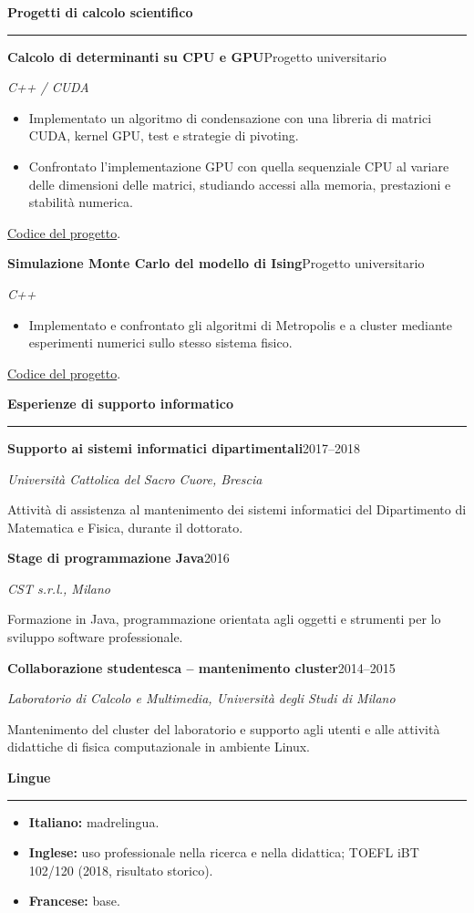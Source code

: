\documentclass[10pt,a4paper]{article}
\newcommand{\cvsection}[1]{%
    \Needspace{4\baselineskip}%
    \vspace{0.8em}%
    {\large\bfseries\color{accent} #1}\par
    \vspace{0.2em}\hrule\vspace{0.45em}%
}
\newcommand{\entry}[4]{%
    \Needspace{4\baselineskip}%
    \textbf{#1}\hfill #2\par
    \textit{#3}\par
    #4\par\vspace{0.45em}%
}
\begin{document}
\cvsection{Progetti di calcolo scientifico}
\entry{Calcolo di determinanti su CPU e GPU}{Progetto universitario}{C++ / CUDA}{%
\begin{itemize}
    \item Implementato un algoritmo di condensazione con una libreria di matrici CUDA, kernel GPU, test e strategie di pivoting.
    \item Confrontato l'implementazione GPU con quella sequenziale CPU al variare delle dimensioni delle matrici, studiando accessi alla memoria, prestazioni e stabilità numerica.
\end{itemize}
\href{https://github.com/MasterToninus/Computational-Physics-Exercise/tree/master/Condensation\%20Algorithm\%20in\%20CUDA}{Codice del progetto}.}
\entry{Simulazione Monte Carlo del modello di Ising}{Progetto universitario}{C++}{%
\begin{itemize}
    \item Implementato e confrontato gli algoritmi di Metropolis e a cluster mediante esperimenti numerici sullo stesso sistema fisico.
\end{itemize}
\href{https://github.com/MasterToninus/Computational-Physics-Exercise/tree/master/Ising\%20simulation\%20Metropolis\%20vs\%20Cluster}{Codice del progetto}.}

\cvsection{Esperienze di supporto informatico}
\entry{Supporto ai sistemi informatici dipartimentali}{2017--2018}{Università Cattolica del Sacro Cuore, Brescia}{%
Attività di assistenza al mantenimento dei sistemi informatici del Dipartimento di Matematica e Fisica, durante il dottorato.}
\entry{Stage di programmazione Java}{2016}{CST s.r.l., Milano}{%
Formazione in Java, programmazione orientata agli oggetti e strumenti per lo sviluppo software professionale.}
\entry{Collaborazione studentesca -- mantenimento cluster}{2014--2015}{Laboratorio di Calcolo e Multimedia, Università degli Studi di Milano}{%
Mantenimento del cluster del laboratorio e supporto agli utenti e alle attività didattiche di fisica computazionale in ambiente Linux.}

\cvsection{Lingue}
\begin{itemize}
    \item \textbf{Italiano:} madrelingua.
    \item \textbf{Inglese:} uso professionale nella ricerca e nella didattica; TOEFL iBT 102/120 (2018, risultato storico).
    \item \textbf{Francese:} base.
\end{itemize}
\end{document}
